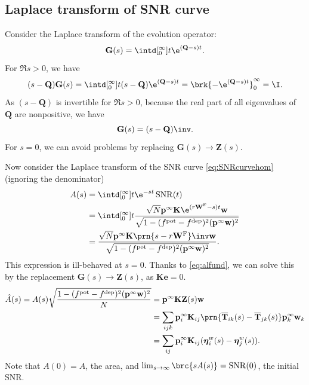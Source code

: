 \documentclass[12pt]{article}
\newcommand{\onev}{\mathbf{e}}
\newcommand{\MM}{\mathbf{Q}}
\newcommand{\pr}{\mathbf{p}}
\newcommand{\eq}{\pr^\infty}
\newcommand{\fpt}{\mathbf{T}}
\newcommand{\fptb}{\overline{\fpt}}
\newcommand{\fund}{\mathbf{Z}}
\newcommand{\etw}{\boldsymbol{\eta}^w}
\newcommand{\w}{\mathbf{w}}
\newcommand{\W}{\mathbf{W}}
\newcommand{\enc}{\mathbf{K}}
\newcommand{\frg}{\W^{\mathrm{F}}}
\newcommand{\pot}{^{\text{pot}}}
\newcommand{\dep}{^{\text{dep}}}
\DeclareMathOperator{\SNR}{SNR}
\begin{document}
\subsection{Laplace transform of SNR curve}\label{sec:laplaceSNR}

Consider the Laplace transform of the evolution operator:
%
\begin{equation}\label{eq:levol}
  \mathbf{G}(s) = \intd[_0^{\infty}]{t} \e^{(\MM-s) t}.
\end{equation}
%
For $\Re s>0$, we have
%
\begin{equation}\label{eq:levolcalc}
  (s-\MM)\mathbf{G}(s) = \intd[_0^{\infty}]{t} (s-\MM)\e^{(\MM-s) t} = \brk{-\e^{(\MM-s) t}}_0^{\infty} = \I.
\end{equation}
%
As $(s-\MM)$ is invertible for $\Re s>0$, because the real part of all eigenvalues of $\MM$ are nonpositive, we have
%
\begin{equation}\label{eq:levolres}
  \mathbf{G}(s) = (s-\MM)\inv.
\end{equation}
%
For $s=0$, we can avoid problems by replacing $\mathbf{G}(s) \to \fund(s)$.

Now consider the Laplace transform of the SNR curve \eqref{eq:SNRcurvehom} (ignoring the denominator)
%
\begin{equation}\label{eq:lsnr}
\begin{aligned}
  A(s) &= \intd[_0^{\infty}]{t} \e^{-st}\SNR(t) \\
   &= \intd[_0^{\infty}]{t} \frac{ \sqrt{N} \eq \enc \e^{(r\frg-s)t} \w }{ \sqrt{1-(f\pot-f\dep)^2(\eq\w)^2} } \\
   &= \frac{\sqrt{N} \eq \enc \prn{s - r\frg}\inv \w }{\sqrt{1-(f\pot-f\dep)^2(\eq\w)^2}}.
\end{aligned}
\end{equation}
%
This expression is ill-behaved at $s=0$.
Thanks to \eqref{eq:alfund}, we can solve this by the replacement $\mathbf{G}(s) \to \fund(s)$, as $\enc\onev=0$.
%
\begin{equation}\label{eq:larea}
\begin{aligned}
  \hat{A}(s) = A(s) \sqrt{\frac{{{1-(f\pot-f\dep)^2(\eq\w)^2}}}{N}}  &=  \eq \enc \fund(s) \w \\
    &= \sum_{ijk} \eq_i \enc_{ij} \prn{\fptb_{ik}(s)-\fptb_{jk}(s)} \eq_k \w_k \\
    &= \sum_{ij}  \eq_i \enc_{ij} (\etw_{i}(s) - \etw_{j}(s)).
\end{aligned}
\end{equation}
%
Note that $A(0)=A$, the area, and $\lim_{s\to\infty} \brc{sA(s)} = \SNR(0)$, the initial SNR.
\end{document}
